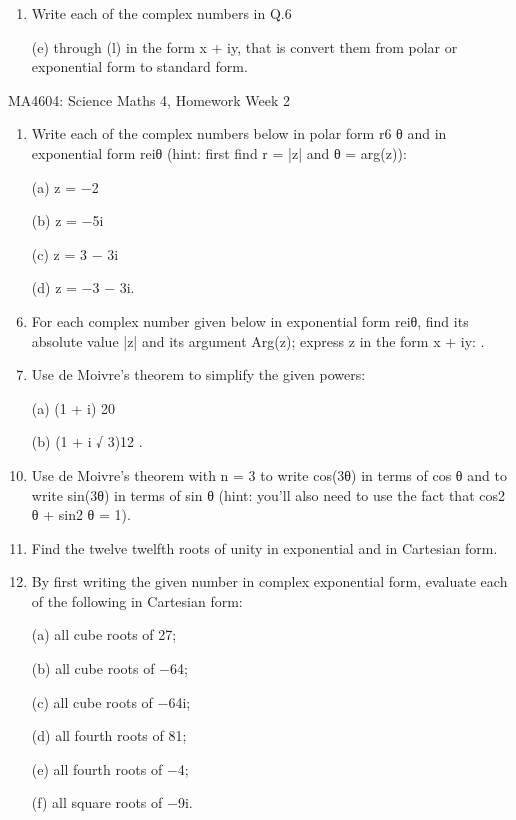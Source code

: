 \documentclass[12pt, a4paper]{report}
\theoremstyle{plain}
\theoremstyle{definition}
\theoremstyle{remark}
\begin{document}
\begin{enumerate}
\item Write each of the complex numbers in Q.6 
\item[(e)] through (l) in the form x + iy, that is
convert them from polar or exponential form to standard form.
\end{enumerate}

\newpage
MA4604: Science Maths 4, Homework Week 2
\begin{enumerate}
\item Write each of the complex numbers below in polar form r6 θ and in exponential form reiθ
(hint: first find r = |z| and θ = arg(z)):
\item[(a)] z = −2 \item[(b)] z = −5i \item[(c)] z = 3 − 3i \item[(d)] z = −3 − 3i.
\item For each complex number given below in exponential form reiθ, find its absolute value |z|
and its argument Arg(z); express z in the form x + iy:
.
\item Use de Moivre’s theorem to simplify the given powers: \item[(a)] (1 + i)
20 \item[(b)] (1 + i
√
3)12
.
\item Use de Moivre’s theorem with n = 3 to write cos(3θ) in terms of cos θ and to write sin(3θ)
in terms of sin θ (hint: you’ll also need to use the fact that cos2
θ + sin2
θ = 1).
\item Find the twelve twelfth roots of unity in exponential and in Cartesian form.
\item By first writing the given number in complex exponential form, evaluate each of the
following in Cartesian form: \item[(a)] all cube roots of 27; \item[(b)] all cube roots of −64;
\item[(c)] all cube roots of −64i; \item[(d)] all fourth roots of 81; \item[(e)] all fourth roots of −4;
\item[(f)] all square roots of −9i.

\end{enumerate}
\end{document}
